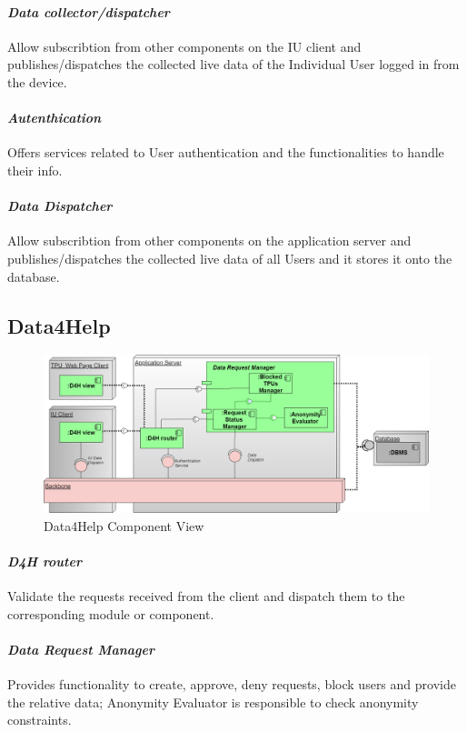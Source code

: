 \paragraph{\textit{Data collector/dispatcher}} Allow subscribtion from other components on the IU client and publishes/dispatches the collected live data of the Individual User logged in from the device. 
\paragraph{\textit{Autenthication}} Offers services related to User authentication and the functionalities to handle their info.
\paragraph{\textit{Data Dispatcher}} Allow subscribtion from other components on the application server and publishes/dispatches the collected live data of all Users and it stores it onto the database.
\subsection{Data4Help}
\label{subsect:D4HComponentView}
\begin{figure}[H]
\caption{Data4Help Component View}
\includegraphics[width = \textwidth]{sections/architecturalDesign/D4HDiagram.png}
\end{figure}
\paragraph{\textit{D4H router}} Validate the requests received from the client and dispatch them to the corresponding module or component.
\paragraph{\textit{Data Request Manager}} Provides functionality to create, approve, deny requests, block users and provide the relative data; Anonymity Evaluator is responsible to check anonymity constraints. 
